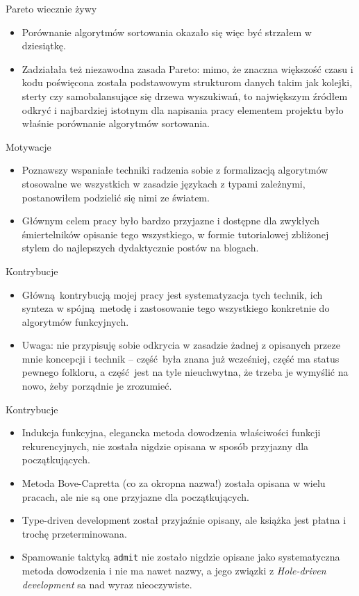 \documentclass{beamer}
\begin{document}
\begin{frame}{Pareto wiecznie żywy}
\begin{itemize}
	\item Porównanie algorytmów sortowania okazało się więc być strzałem w dziesiątkę.
	\item Zadziałała też niezawodna zasada Pareto: mimo, że znaczna większość czasu i kodu poświęcona została podstawowym strukturom danych takim jak kolejki, sterty czy samobalansujące się drzewa wyszukiwań, to największym źródłem odkryć i najbardziej istotnym dla napisania pracy elementem projektu było właśnie porównanie algorytmów sortowania.
\end{itemize}
\end{frame}

\begin{frame}{Motywacje}
\begin{itemize}
	\item Poznawszy wspaniałe techniki radzenia sobie z formalizacją algorytmów stosowalne we wszystkich w zasadzie językach z typami zależnymi, postanowiłem podzielić się nimi ze światem.
	\item Głównym celem pracy było bardzo przyjazne i dostępne dla zwykłych śmiertelników opisanie tego wszystkiego, w formie tutorialowej zbliżonej stylem do najlepszych dydaktycznie postów na blogach.
\end{itemize}
\end{frame}

\begin{frame}{Kontrybucje}
\begin{itemize}
	\item Główną kontrybucją mojej pracy jest systematyzacja tych technik, ich synteza w spójną metodę i zastosowanie tego wszystkiego konkretnie do algorytmów funkcyjnych.
	\item Uwaga: nie przypisuję sobie odkrycia w zasadzie żadnej z opisanych przeze mnie koncepcji i technik -- część była znana już wcześniej, część ma status pewnego folkloru, a część jest na tyle nieuchwytna, że trzeba je wymyślić na nowo, żeby porządnie je zrozumieć.
\end{itemize}
\end{frame}

\begin{frame}{Kontrybucje}
\begin{itemize}
	\item Indukcja funkcyjna, elegancka metoda dowodzenia właściwości funkcji rekurencyjnych, nie została nigdzie opisana w sposób przyjazny dla początkujących.
	\item Metoda Bove-Capretta (co za okropna nazwa!) została opisana w wielu pracach, ale nie są one przyjazne dla początkujących.
	\item Type-driven development został przyjaźnie opisany, ale książka jest płatna i trochę przeterminowana.
	\item Spamowanie taktyką \texttt{admit} nie zostało nigdzie opisane jako systematyczna metoda dowodzenia i nie ma nawet nazwy, a jego związki z \textit{Hole-driven development} sa nad wyraz nieoczywiste.
\end{itemize}
\end{frame}
\end{document}
